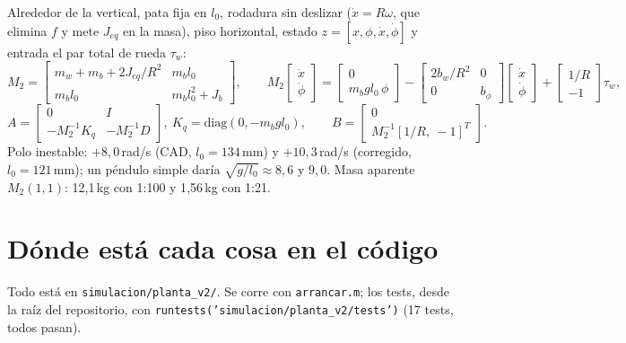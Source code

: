 \documentclass[11pt,a4paper]{article}
\newcommand{\code}[1]{\texttt{#1}}
\begin{document}
Alrededor de la vertical, pata fija en $l_0$, rodadura sin deslizar ($\dot x = R\omega$, que elimina $f$ y mete
$J_{eq}$ en la masa), piso horizontal, estado $z = [x, \phi, \dot x, \dot\phi]$ y entrada el par total de
rueda $\tau_w$:
\begin{equation}
  M_2 = \begin{bmatrix} m_w + m_b + 2J_{eq}/R^2 & m_b l_0 \\ m_b l_0 & m_b l_0^2 + J_b \end{bmatrix},\qquad
  M_2\begin{bmatrix}\ddot x\\ \ddot\phi\end{bmatrix} = \begin{bmatrix} 0 \\ m_b g l_0\,\phi\end{bmatrix} - \begin{bmatrix} 2b_w/R^2 & 0 \\ 0 & b_\phi\end{bmatrix}\begin{bmatrix}\dot x\\ \dot\phi\end{bmatrix} + \begin{bmatrix} 1/R \\ -1\end{bmatrix}\tau_w,
\end{equation}
\begin{equation}
  A = \begin{bmatrix} 0 & I \\ -M_2^{-1}K_q & -M_2^{-1}D\end{bmatrix},\ K_q = \mathrm{diag}(0, -m_b g l_0),\qquad
  B = \begin{bmatrix} 0 \\ M_2^{-1}[1/R,\ -1]^T\end{bmatrix}.
\end{equation}
Polo inestable: $+8{,}0$\,rad/s (CAD, $l_0 = 134$\,mm) y $+10{,}3$\,rad/s (corregido, $l_0 = 121$\,mm); un
péndulo simple daría $\sqrt{g/l_0} \approx 8{,}6$ y $9{,}0$. Masa aparente $M_2(1,1)$: 12{,}1\,kg con 1:100
y 1{,}56\,kg con 1:21.

\section{Dónde está cada cosa en el código}

Todo está en \code{simulacion/planta\_v2/}. Se corre con \code{arrancar.m}; los tests, desde la raíz del
repositorio, con \code{runtests('simulacion/planta\_v2/tests')} (17 tests, todos pasan).
\end{document}
